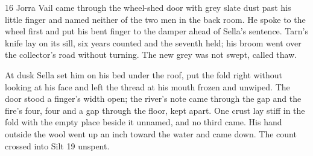 \begin{CRchronicle}{16}
Jorra Vail came through the wheel-shed door with grey slate dust past his little finger and named neither of the two men in the back room. He spoke to the wheel first and put his bent finger to the damper ahead of Sella’s sentence. Tarn’s knife lay on its sill, six years counted and the seventh held; his broom went over the collector’s road without turning. The new grey was not swept, called thaw.

At dusk Sella set him on his bed under the roof, put the fold right without looking at his face and left the thread at his mouth frozen and unwiped. The door stood a finger’s width open; the river’s note came through the gap and the fire’s four, four and a gap through the floor, kept apart. One crust lay stiff in the fold with the empty place beside it unnamed, and no third came. His hand outside the wool went up an inch toward the water and came down. The count crossed into Silt 19 unspent.
\end{CRchronicle}
